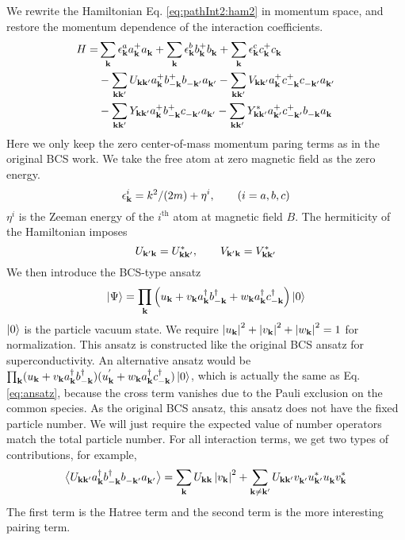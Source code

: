 We rewrite the Hamiltonian Eq. \ref{eq:pathInt2:ham2} in momentum space, and restore the momentum dependence of the interaction coefficients.  
\begin{equation}\label{eq:uvw:hamiltonian}
\begin{split}
 H=&\sum_{\mathbf{k}}\epsilon^a_{\mathbf{k}}{}a^+_{\mathbf{k}}{}a^{}_{\mathbf{k}}+\sum_{\mathbf{k}}\epsilon^b_{\mathbf{k}}{}b^+_{\mathbf{k}}{}b^{}_{\mathbf{k}}+\sum_{\mathbf{k}}\epsilon^c_{\mathbf{k}}{}c^+_{\mathbf{k}}{}c^{}_{\mathbf{k}}\\
  &-\sum_{\mathbf{k}\mathbf{k}'}U_{\mathbf{k}\mathbf{k}'}a^+_{\mathbf{k}}{}b^+_{-\mathbf{k}}{}b^{}_{-\mathbf{k}'}a^{}_{\mathbf{k}'}
	-\sum_{\mathbf{k}\mathbf{k}'}V_{\mathbf{k}\mathbf{k}'}a^+_{\mathbf{k}}{}c^+_{-\mathbf{k}}{}c^{}_{-\mathbf{k}'}a^{}_{\mathbf{k}'}\\
 &-\sum_{\mathbf{k}\mathbf{k}'}Y_{\mathbf{k}\mathbf{k}'}a^+_{\mathbf{k}}{}b^+_{-\mathbf{k}}{}c^{}_{-\mathbf{k}'}a^{}_{\mathbf{k}'}
	-\sum_{\mathbf{k}\mathbf{k}'}Y^*_{\mathbf{k}\mathbf{k}'}a^+_{\mathbf{k}'}{}c^+_{-\mathbf{k}'}{}b^{}_{-\mathbf{k}}a^{}_{\mathbf{k}}
\end{split} 
\end{equation}
Here we only keep the zero center-of-mass momentum paring terms as in the original BCS work\cite{BCS}. 
We take the free atom at zero magnetic field as the  zero energy.  
\begin{equation*}
\epsilon_{\mathbf{k}}^i=k^2/(2m)+\eta^i, \qquad (i=a,b,c)
\end{equation*}
 $\eta^i$ is the Zeeman energy of the $i^{\text{th}}$ atom at magnetic field $B$. The hermiticity  of the Hamiltonian imposes
 \begin{equation}
 U_{\mathbf{k}'\mathbf{k}}=U^*_{\mathbf{k}\mathbf{k}'},\qquad{} V_{\mathbf{k}'\mathbf{k}}=V^*_{\mathbf{k}\mathbf{k}'}
\end{equation}
  We then introduce the BCS-type ansatz 
\begin{equation}\label{eq:ansatz}
 \left|\Psi\right>=\prod_{\mathbf{k}}\left(u_{\mathbf{k}}+v_{\mathbf{k}}{}a^{\dagger}_{\mathbf{k}}{}b^{\dagger}_{-\mathbf{k}}+w_{\mathbf{k}}{}a^{\dagger}_{\mathbf{k}}{}c^{\dagger}_{-\mathbf{k}}\right)\left|0\right>
\end{equation}
$\left|0\right>$ is the particle vacuum state.  We require $\left\lvert{u_{\ensuremath{\mathbf{k}}}}\right\rvert^2+\left\lvert{v_{\ensuremath{\mathbf{k}}}}\right\rvert^2+\left\lvert{w_{\ensuremath{\mathbf{k}}}}\right\rvert^2=1$ for normalization.  This ansatz is constructed like the original BCS ansatz for superconductivity.  An alternative ansatz would be $\prod_{\mathbf{k}}(u_{\mathbf{k}}+v_{\mathbf{k}}{}a^{\dagger}_{\mathbf{k}}{}b^{\dagger}_{-\mathbf{k}})(u^{'}_{\mathbf{k}}+w_{\mathbf{k}}{}a^{\dagger}_{\mathbf{k}}{}c^{\dagger}_{-\mathbf{k}})\left|0\right>$, which is actually the same as Eq. \ref{eq:ansatz}, because  the cross term vanishes due to the Pauli exclusion on the common species.   As the original BCS ansatz, this ansatz does not have the fixed particle number.  We  will just require the expected value of number operators match the total particle number. For all  interaction terms, we get  two types of contributions,
for example, 
\begin{equation*}
\bigl<{U_{\mathbf{k}\mathbf{k}'}a^{\dagger}_{\mathbf{k}}{}b^{\dagger}_{-\mathbf{k}}{}b^{}_{-\mathbf{k}'}a^{}_{\mathbf{k}'}}\bigr>
=\sum_{\mathbf{k}}U_{\mathbf{k}\mathbf{k}}\left\lvert{v_{\ensuremath{\mathbf{k}}}}\right\rvert^2+\sum_{\mathbf{k}\neq\mathbf{k}'}U_{\mathbf{k}\mathbf{k}'}v^{}_{\mathbf{k}'}u^*_{\mathbf{k}'}u^{}_{\mathbf{k}}{}v^*_{\mathbf{k}}
\end{equation*}
The first term is the Hatree term and the second term is the more interesting pairing term.  


